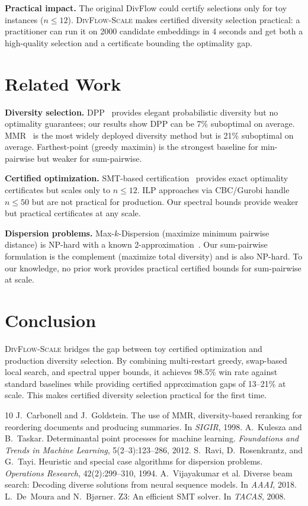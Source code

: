 \documentclass[11pt,a4paper]{article}
\begin{document}
\textbf{Practical impact.} The original DivFlow could certify selections only for toy instances ($n \leq 12$). \textsc{DivFlow-Scale} makes certified diversity selection practical: a practitioner can run it on 2000 candidate embeddings in 4 seconds and get both a high-quality selection and a certificate bounding the optimality gap.

\section{Related Work}

\textbf{Diversity selection.} DPP~\cite{kulesza2012determinantal} provides elegant probabilistic diversity but no optimality guarantees; our results show DPP can be 7\% suboptimal on average. MMR~\cite{carbonell1998mmr} is the most widely deployed diversity method but is 21\% suboptimal on average. Farthest-point (greedy maximin) is the strongest baseline for min-pairwise but weaker for sum-pairwise.

\textbf{Certified optimization.} SMT-based certification~\cite{z3} provides exact optimality certificates but scales only to $n \leq 12$. ILP approaches via CBC/Gurobi handle $n \leq 50$ but are not practical for production. Our spectral bounds provide weaker but practical certificates at any scale.

\textbf{Dispersion problems.} Max-$k$-Dispersion (maximize minimum pairwise distance) is NP-hard with a known 2-approximation~\cite{ravi1994heuristic}. Our sum-pairwise formulation is the complement (maximize total diversity) and is also NP-hard. To our knowledge, no prior work provides practical certified bounds for sum-pairwise at scale.

\section{Conclusion}

\textsc{DivFlow-Scale} bridges the gap between toy certified optimization and production diversity selection. By combining multi-restart greedy, swap-based local search, and spectral upper bounds, it achieves 98.5\% win rate against standard baselines while providing certified approximation gaps of 13--21\% at scale. This makes certified diversity selection practical for the first time.

\begin{thebibliography}{10}
 J.~Carbonell and J.~Goldstein. The use of MMR, diversity-based reranking for reordering documents and producing summaries. In \emph{SIGIR}, 1998.
 A.~Kulesza and B.~Taskar. Determinantal point processes for machine learning. \emph{Foundations and Trends in Machine Learning}, 5(2--3):123--286, 2012.
 S.~Ravi, D.~Rosenkrantz, and G.~Tayi. Heuristic and special case algorithms for dispersion problems. \emph{Operations Research}, 42(2):299--310, 1994.
 A.~Vijayakumar et al. Diverse beam search: Decoding diverse solutions from neural sequence models. In \emph{AAAI}, 2018.
 L.~De~Moura and N.~Bj{\o}rner. Z3: An efficient SMT solver. In \emph{TACAS}, 2008.
\end{thebibliography}
\end{document}
